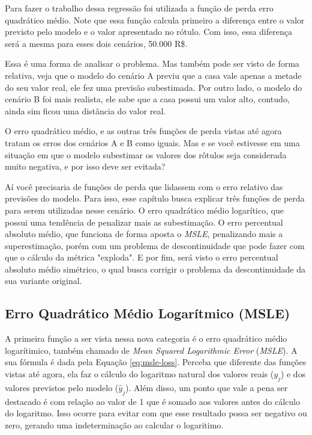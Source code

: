 Para fazer o trabalho dessa regressão foi utilizada a função de perda erro quadrático médio. Note que essa função calcula primeiro a diferença entre o valor previsto pelo modelo e o valor apresentado no rótulo. Com isso, essa diferença será a mesma para esses dois cenários, 50.000 R\$.

Essa é uma forma de analisar o problema. Mas também pode ser visto de forma relativa, veja que o modelo do cenário A previu que a casa vale apenas a metade do seu valor real, ele fez uma previsão subestimada. Por outro lado, o modelo do cenário B foi mais realista, ele sabe que a casa possui um valor alto, contudo, ainda sim ficou uma distância do valor real. 

O erro quadrático médio, e as outras três funções de perda vistas até agora tratam os erros dos cenários A e B como iguais. Mas e se você estivesse em uma situação em que o modelo subestimar os valores dos rôtulos seja considerada muito negativa, e por isso deve ser evitada?

Aí você precisaria de funções de perda que lidassem com o erro relativo das previsões do modelo. Para isso, esse capítulo busca explicar três funções de perda para serem utilizadas nesse cenário. O erro quadrático médio logarítico, que possui uma tendência de penalizar mais as subestimação. O erro percentual absoluto médio, que funciona de forma aposta o \textit{MSLE}, penalizando mais a superestimação, porém com um problema de descontinuidade que pode fazer com que o cálculo da métrica "exploda". E por fim, será visto o erro percentual absoluto médio simétrico, o qual busca corrigir o problema da descontinuidade da sua variante original.

\subsection{Erro Quadrático Médio Logarítmico (MSLE)}

A primeira função a ser vista nessa nova categoria é o erro quadrático médio logarítimico, também chamado de \textit{Mean Squared Logarithmic Error} (\textit{MSLE}). A sua fórmula é dada pela Equação \ref{eq:msle-loss}. Perceba que diferente das funções vistas até agora, ela faz o cálculo do logaritmo natural dos valores reais ($y_j$) e dos valores previstos pelo modelo ($\hat{y}_j$). Além disso, um ponto que vale a pena ser destacado é com relação ao valor de 1 que é somado aos valores antes do cálculo do logaritmo. Isso ocorre para evitar com que esse resultado possa ser negativo ou zero, gerando uma indeterminação ao calcular o logaritimo.

